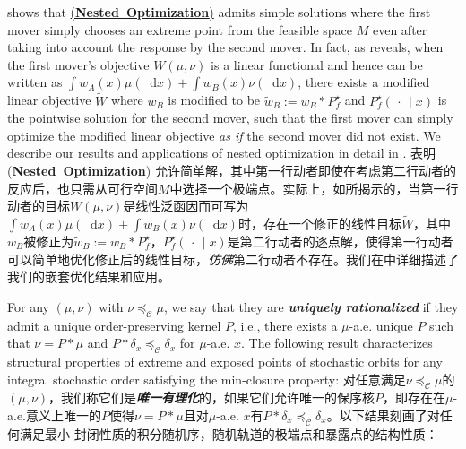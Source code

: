 \documentclass[12pt,letterpaper]{article}
\newenvironment{original}{\color{black}}{}
\newenvironment{translation}{\color{blue}}{}
\theoremstyle{plain}
\theoremstyle{definition}
\theoremstyle{remark}
\newcommand{\C}{\mathcal{C}}
\renewcommand*\d{\mathop{}\!\mathrm{d}}
\theoremstyle{definition}
\DeclareRobustCommand{\weqref}[2]{
  \leavevmode\nobreak\hbox{\hyperlink{#2}{\textup{(#1)}}}
}
\begin{document}
\begin{original}
 shows that \weqref{\textbf{Nested Optimization}}{eq:nested-optimization} admits simple solutions where the first mover simply chooses an extreme point from the feasible space $M$ even after taking into account the response by the second mover. In fact, as  reveals, when the first mover's objective $W(\mu, \nu)$ is a linear functional and hence can be written as $\int w_A(x) \mu(\d x) + \int w_B(x) \nu(\d x)$, there exists a modified linear objective $\widetilde{W}$ where $w_B$ is modified to be $\widetilde{w}_B:=w_B*P^\star_f$ and  $P^\star_f(\,\cdot\,\mid x)$ is the pointwise solution for the second mover, such that the first mover can simply optimize the modified linear objective \textit{as if} the second mover did not exist. We describe our results and applications of nested optimization in detail in .
\end{original}
\begin{translation}
表明\weqref{\textbf{Nested Optimization}}{eq:nested-optimization}允许简单解，其中第一行动者即使在考虑第二行动者的反应后，也只需从可行空间$M$中选择一个极端点。实际上，如所揭示的，当第一行动者的目标$W(\mu, \nu)$是线性泛函因而可写为$\int w_A(x) \mu(\d x) + \int w_B(x) \nu(\d x)$时，存在一个修正的线性目标$\widetilde{W}$，其中$w_B$被修正为$\widetilde{w}_B:=w_B*P^\star_f$，$P^\star_f(\,\cdot\,\mid x)$是第二行动者的逐点解，使得第一行动者可以简单地优化修正后的线性目标，\textit{仿佛}第二行动者不存在。我们在中详细描述了我们的嵌套优化结果和应用。
\end{translation}

\begin{original}
For any $(\mu, \nu)$ with $\nu \preceq_\C \mu$, we say that they are \textit{\textbf{uniquely rationalized}} if they admit a unique order-preserving kernel $P$, i.e., there exists a $\mu$-a.e. unique $P$ such that $\nu = P* \mu$ and $P *\delta_x \preceq_\C \delta_x$ for $\mu$-a.e. $x$.  The following result characterizes structural properties of extreme and exposed points of stochastic orbits for any integral stochastic order satisfying the min-closure property:
\end{original}
\begin{translation}
对任意满足$\nu \preceq_\C \mu$的$(\mu, \nu)$，我们称它们是\textit{\textbf{唯一有理化}}的，如果它们允许唯一的保序核$P$，即存在在$\mu$-a.e.意义上唯一的$P$使得$\nu = P* \mu$且对$\mu$-a.e. $x$有$P *\delta_x \preceq_\C \delta_x$。以下结果刻画了对任何满足最小-封闭性质的积分随机序，随机轨道的极端点和暴露点的结构性质：
\end{translation}
\end{document}
